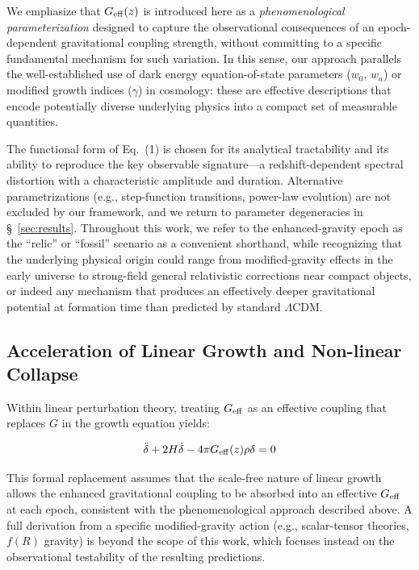 \documentclass[twocolumn]{aastex631}
\begin{document}
We emphasize that $G_{\rm eff}(z)$ is introduced here as a \textit{phenomenological parameterization} designed to capture the observational consequences of an epoch-dependent gravitational coupling strength, without committing to a specific fundamental mechanism for such variation. In this sense, our approach parallels the well-established use of dark energy equation-of-state parameters ($w_0$, $w_a$) or modified growth indices ($\gamma$) in cosmology: these are effective descriptions that encode potentially diverse underlying physics into a compact set of measurable quantities.

The functional form of Eq.~(1) is chosen for its analytical tractability and its ability to reproduce the key observable signature---a redshift-dependent spectral distortion with a characteristic amplitude and duration. Alternative parametrizations (e.g., step-function transitions, power-law evolution) are not excluded by our framework, and we return to parameter degeneracies in \S~\ref{sec:results}. Throughout this work, we refer to the enhanced-gravity epoch as the ``relic'' or ``fossil'' scenario as a convenient shorthand, while recognizing that the underlying physical origin could range from modified-gravity effects in the early universe to strong-field general relativistic corrections near compact objects, or indeed any mechanism that produces an effectively deeper gravitational potential at formation time than predicted by standard $\Lambda$CDM.

\subsection{Acceleration of Linear Growth and Non-linear Collapse}
Within linear perturbation theory, treating $G_{\rm eff}$ as an effective coupling that replaces $G$ in the growth equation yields:

\begin{equation}
    \ddot{\delta} + 2H\dot{\delta} - 4\pi G_{\rm eff}(z) \rho \delta = 0
\end{equation}

This formal replacement assumes that the scale-free nature of linear growth allows the enhanced gravitational coupling to be absorbed into an effective $G_{\rm eff}$ at each epoch, consistent with the phenomenological approach described above. A full derivation from a specific modified-gravity action (e.g., scalar-tensor theories, $f(R)$ gravity) is beyond the scope of this work, which focuses instead on the observational testability of the resulting predictions.
\end{document}
